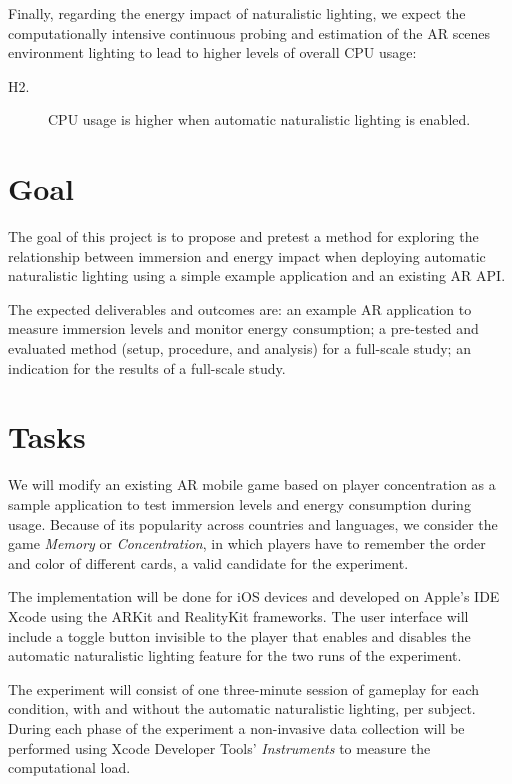\documentclass[12pt,twoside,english]{article}
\begin{document}
Finally, regarding the energy impact of naturalistic lighting, we expect the computationally intensive continuous probing and estimation of the \gls{AR} scenes environment lighting to lead to higher levels of overall \gls{CPU} usage:

\begin{description}
    \item[H2.] \gls{CPU} usage is higher when automatic naturalistic lighting is enabled.
\end{description}


\section{Goal}
\label{sect:goals}

The goal of this project is to propose and pretest a method for exploring the relationship between immersion and energy impact when deploying automatic naturalistic lighting using a simple example application and an existing \gls{AR} \gls{API}.

The expected deliverables and outcomes are: an example \gls{AR} application to measure immersion levels and monitor energy consumption; a pre-tested and evaluated method (setup, procedure, and analysis) for a full-scale study; an indication for the results of a full-scale study.

\section{Tasks}
\label{sect:tasks}

We will modify an existing \gls{AR} mobile game based on player concentration as a sample application to test immersion levels and energy consumption during usage.
Because of its popularity across countries and languages, we consider the game \textit{Memory} or \textit{Concentration}, in which players have to remember the order and color of different cards, a valid candidate for the experiment.

The implementation will be done for iOS devices and developed on Apple's \gls{IDE} Xcode using the ARKit and RealityKit frameworks.
The user interface will include a toggle button invisible to the player that enables and disables the automatic naturalistic lighting feature for the two runs of the experiment.

The experiment will consist of one three-minute session of gameplay for each condition, with and without the automatic naturalistic lighting, per subject.
During each phase of the experiment a non-invasive data collection will be performed using Xcode Developer Tools' \emph{Instruments} to measure the computational load.
\end{document}
